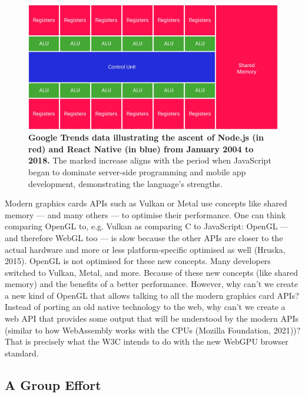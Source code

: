 \documentclass[10pt]{article}
\begin{document}
\begin{sloppypar}
  \begin{figure}[ht]
    \centering
    \includegraphics[width=\textwidth]{figures/shared-memory.png}
    \caption[Google Trends data illustrating the ascent of Node.js and React Native.]{\textbf{Google Trends data illustrating the ascent of Node.js (in red) and React Native (in blue) from January 2004 to 2018.} The marked increase aligns with the period when JavaScript began to dominate server-side programming and mobile app development, demonstrating the language’s strengths.}
    \label{fig:shared-memory}
  \end{figure}

  Modern graphics cards APIs such as Vulkan or Metal use concepts like shared memory — and many others — to optimise their performance. One can think comparing OpenGL to, e.g. Vulkan as comparing C to JavaScript: OpenGL — and therefore WebGL too — is slow because the other APIs are closer to the actual hardware and more or less platform-specific optimised as well (Hruska, 2015). OpenGL is not optimised for these new concepts. Many developers switched to Vulkan, Metal, and more. Because of these new concepts (like shared memory) and the benefits of a better performance. However, why can’t we create a new kind of OpenGL that allows talking to all the modern graphics card APIs? Instead of porting an old native technology to the web, why can’t we create a web API that provides some output that will be understood by the modern APIs (similar to how WebAssembly works with the CPUs (Mozilla Foundation, 2021))? That is precisely what the W3C intends to do with the new WebGPU browser standard.

  \subsection{A Group Effort}
  \label{subsec:a-group-effort}


\end{sloppypar}
\end{document}
